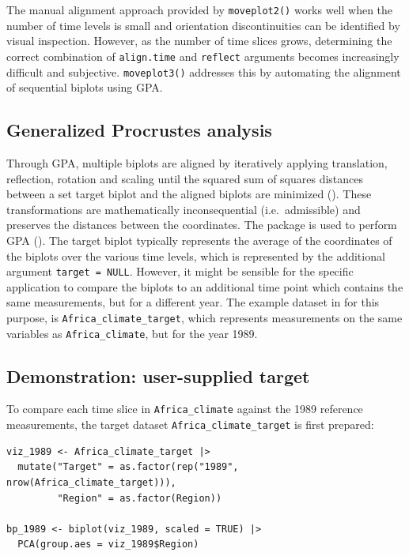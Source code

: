 The manual alignment approach provided by \texttt{moveplot2()} works well when the number of time levels is small and orientation discontinuities can be identified by visual inspection. However, as the number of time slices grows, determining the correct combination of \texttt{align.time} and \texttt{reflect} arguments becomes increasingly difficult and subjective. \texttt{moveplot3()} addresses this by automating the alignment of sequential biplots using GPA.

\subsection{Generalized Procrustes analysis}\label{generalized-procrustes-analysis}

Through GPA, multiple biplots are aligned by iteratively applying translation, reflection, rotation and scaling until the squared sum of squares distances between a set target biplot and the aligned biplots are minimized (\citet{Proc}). These transformations are mathematically inconsequential (i.e.~admissible) and preserves the distances between the coordinates. The  package is used to perform GPA (\citet{GPAbinpack}). The target biplot typically represents the average of the coordinates of the biplots over the various time levels, which is represented by the additional argument \texttt{target\ =\ NULL}. However, it might be sensible for the specific application to compare the biplots to an additional time point which contains the same measurements, but for a different year. The example dataset in  for this purpose, is \texttt{Africa\_climate\_target}, which represents measurements on the same variables as \texttt{Africa\_climate}, but for the year 1989.

\subsection{Demonstration: user-supplied target}\label{demonstration-user-supplied-target}

To compare each time slice in \texttt{Africa\_climate} against the 1989 reference measurements, the target dataset \texttt{Africa\_climate\_target} is first prepared:

\begin{verbatim}
viz_1989 <- Africa_climate_target |> 
  mutate("Target" = as.factor(rep("1989", nrow(Africa_climate_target))), 
         "Region" = as.factor(Region))

bp_1989 <- biplot(viz_1989, scaled = TRUE) |> 
  PCA(group.aes = viz_1989$Region)
\end{verbatim}

